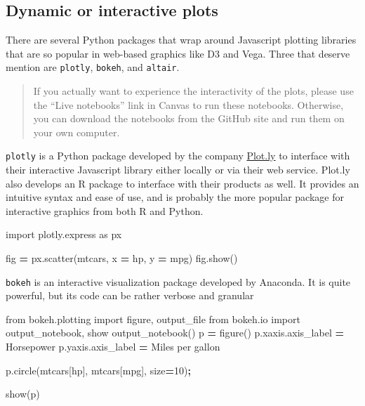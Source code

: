 \documentclass[
  letterpaper,
]{scrbook}
\newenvironment{Shaded}{\begin{snugshade}}{\end{snugshade}}
\newcommand{\DecValTok}[1]{\textcolor[rgb]{0.00,0.00,0.81}{#1}}
\newcommand{\ImportTok}[1]{#1}
\newcommand{\NormalTok}[1]{#1}
\newcommand{\OperatorTok}[1]{\textcolor[rgb]{0.81,0.36,0.00}{\textbf{#1}}}
\newcommand{\StringTok}[1]{\textcolor[rgb]{0.31,0.60,0.02}{#1}}
\begin{document}
\hypertarget{dynamic-or-interactive-plots}{%
\subsection{Dynamic or interactive plots}\label{dynamic-or-interactive-plots}}

There are several Python packages that wrap around Javascript plotting libraries that are so popular in web-based graphics like D3 and Vega. Three that deserve mention are \texttt{plotly}, \texttt{bokeh}, and \texttt{altair}.

\begin{quote}
If you actually want to experience the interactivity of the plots, please use the ``Live notebooks'' link in Canvas to run these notebooks. Otherwise, you can download the notebooks from the GitHub site and run them on your own computer.
\end{quote}

\texttt{plotly} is a Python package developed by the company \href{https://www.plotly.com}{Plot.ly} to interface with their interactive Javascript library either locally or via their web service. Plot.ly also develops an R package to interface with their products as well. It provides an intuitive syntax and ease of use, and is probably the more popular package for interactive graphics from both R and Python.

\begin{Shaded}
\begin{Highlighting}[]
\ImportTok{import}\NormalTok{ plotly.express }\ImportTok{as}\NormalTok{ px}

\NormalTok{fig }\OperatorTok{=}\NormalTok{ px.scatter(mtcars, x }\OperatorTok{=} \StringTok{\textquotesingle{}hp\textquotesingle{}}\NormalTok{, y }\OperatorTok{=} \StringTok{\textquotesingle{}mpg\textquotesingle{}}\NormalTok{)}
\NormalTok{fig.show()}
\end{Highlighting}
\end{Shaded}

\texttt{bokeh} is an interactive visualization package developed by Anaconda. It is quite powerful, but its code can be rather verbose and granular

\begin{Shaded}
\begin{Highlighting}[]
\ImportTok{from}\NormalTok{ bokeh.plotting }\ImportTok{import}\NormalTok{ figure, output\_file}
\ImportTok{from}\NormalTok{ bokeh.io }\ImportTok{import}\NormalTok{ output\_notebook, show}
\NormalTok{output\_notebook()}
\NormalTok{p }\OperatorTok{=}\NormalTok{ figure()}
\NormalTok{p.xaxis.axis\_label }\OperatorTok{=} \StringTok{\textquotesingle{}Horsepower\textquotesingle{}}
\NormalTok{p.yaxis.axis\_label }\OperatorTok{=} \StringTok{\textquotesingle{}Miles per gallon\textquotesingle{}}

\NormalTok{p.circle(mtcars[}\StringTok{\textquotesingle{}hp\textquotesingle{}}\NormalTok{], mtcars[}\StringTok{\textquotesingle{}mpg\textquotesingle{}}\NormalTok{], size}\OperatorTok{=}\DecValTok{10}\NormalTok{)}\OperatorTok{;}

\NormalTok{show(p)}
\end{Highlighting}
\end{Shaded}
\end{document}
